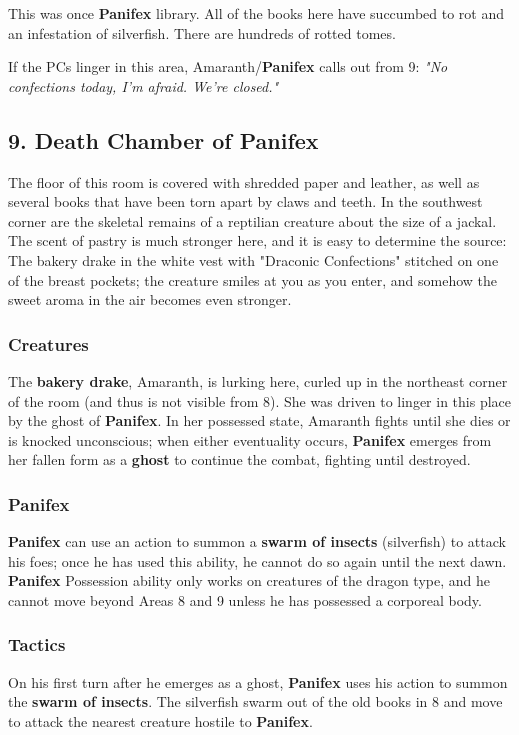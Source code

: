 \documentclass[10pt,a4paper,twoside,bg=print,twocolumn,openany,nodeprecatedcode]{dndbook}
\begin{document}
This was once \textbf{Panifex} library. All of the books here have succumbed to rot and an infestation of silverfish. There are hundreds of rotted tomes.

If the PCs linger in this area, Amaranth/\textbf{Panifex} calls out from 9: \textit{"No confections today, I'm afraid. We're closed."}

\subsection{9. Death Chamber of Panifex}
\begin{DndReadAloud}{}
The floor of this room is covered with shredded paper and leather, as well as several books that have been torn apart by claws and teeth. In the southwest corner are the skeletal remains of a reptilian creature about the size of a jackal. The scent of pastry is much stronger here, and it is easy to determine the source: The bakery drake in the white vest with "Draconic Confections" stitched on one of the breast pockets; the creature smiles at you as you enter, and somehow the sweet aroma in the air becomes even stronger.

\end{DndReadAloud}

\subsubsection{Creatures}
The \textbf{bakery drake}, Amaranth, is lurking here, curled up in the northeast corner of the room (and thus is not visible from 8). She was driven to linger in this place by the ghost of \textbf{Panifex}. In her possessed state, Amaranth fights until she dies or is knocked unconscious; when either eventuality occurs, \textbf{Panifex} emerges from her fallen form as a \textbf{ghost} to continue the combat, fighting until destroyed.

\subsubsection{Panifex}
\textbf{Panifex} can use an action to summon a \textbf{swarm of insects} (silverfish) to attack his foes; once he has used this ability, he cannot do so again until the next dawn. \textbf{Panifex} Possession ability only works on creatures of the dragon type, and he cannot move beyond Areas 8 and 9 unless he has possessed a corporeal body.

\subsubsection{Tactics}
On his first turn after he emerges as a ghost, \textbf{Panifex} uses his action to summon the \textbf{swarm of insects}. The silverfish swarm out of the old books in 8 and move to attack the nearest creature hostile to \textbf{Panifex}.
\end{document}
